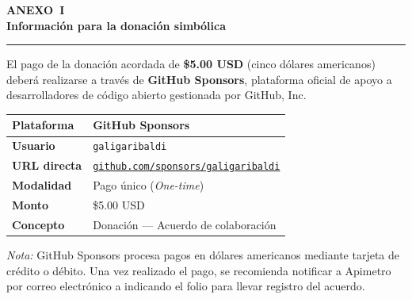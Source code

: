\clearpage
{}

\begin{center}
  {\large\bfseries\color{ColorPrincipal} ANEXO~I}\\[0.2cm]
  {\normalsize\bfseries Información para la donación simbólica}\\[0.1cm]
  {\color{ColorPrincipal!40}\rule{0.5\textwidth}{0.5pt}}
\end{center}

\vspace{0.6cm}

\noindent
El pago de la donación acordada de \textbf{\$5.00 USD} (cinco dólares
americanos) deberá realizarse a través de \textbf{GitHub Sponsors},
plataforma oficial de apoyo a desarrolladores de código abierto gestionada
por GitHub, Inc.

\vspace{0.5cm}

\begin{center}
  \begin{tabular}{ll}
    \toprule
    \textbf{Plataforma}   & GitHub Sponsors \\
    \midrule
    \textbf{Usuario}      & \texttt{galigaribaldi} \\[0.3em]
    \textbf{URL directa}  & \href{https://github.com/sponsors/galigaribaldi}%
                            {\texttt{github.com/sponsors/galigaribaldi}} \\[0.3em]
    \textbf{Modalidad}    & Pago único (\textit{One-time}) \\[0.3em]
    \textbf{Monto}        & \$5.00 USD \\[0.3em]
    \textbf{Concepto}     & Donación — Acuerdo de colaboración \RefDoc{\FolioDoc} \\
    \bottomrule
  \end{tabular}
\end{center}

\vspace{0.5cm}

\noindent
{\small\color{ColorTexto}
  \textit{Nota:} GitHub Sponsors procesa pagos en dólares americanos
  mediante tarjeta de crédito o débito. Una vez realizado el pago, se
  recomienda notificar a Apimetro por correo electrónico a
  \href{mailto:\ContactoEmail}{\ContactoEmail} indicando el folio
  \RefDoc{\FolioDoc} para llevar registro del acuerdo.
}
